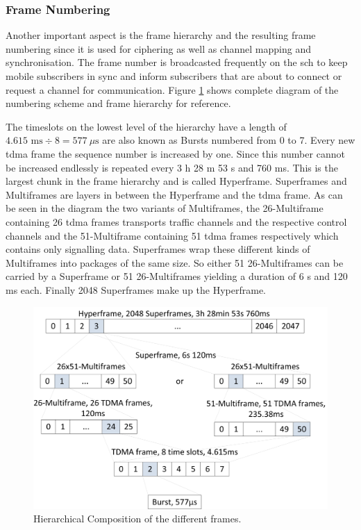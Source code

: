 \subsubsection{Frame Numbering}
Another important aspect is the frame hierarchy and the resulting frame numbering since it is used for ciphering as well as channel mapping and synchronisation.
The frame number is broadcasted frequently on the \gls{sch} to keep mobile subscribers in sync and inform subscribers that are about to connect or request a channel for communication.
Figure \ref{fig:frame_hierarchy} shows complete diagram of the numbering scheme and frame hierarchy for reference.

The timeslots on the lowest level of the hierarchy have a length of $4.615\text{ ms} \div 8 = 577~\mu\text{s}$ are also known as Bursts numbered from 0 to 7.
Every new \gls{tdma} frame the sequence number is increased by one.
Since this number cannot be increased endlessly is repeated every 3 h 28 m 53 s and 760 ms.
This is the largest chunk in the frame hierarchy and is called Hyperframe.
Superframes and Multiframes are layers in between the Hyperframe and the \gls{tdma} frame.
As can be seen in the diagram the two variants of Multiframes, the 26-Multiframe containing 26 \gls{tdma} frames transports traffic channels and the respective control channels and the 51-Multiframe containing 51 \gls{tdma} frames respectively which contains only signalling data.
Superframes wrap these different kinds of Multiframes into packages of the same size.
So either 51 26-Multiframes can be carried by a Superframe or 51 26-Multiframes yielding a duration of 6 s and 120 ms each.
Finally 2048 Superframes make up the Hyperframe.

\begin{figure}
	\centering
	\includegraphics{../Images/Frames}
	\caption{Hierarchical Composition of the different frames.}
	\label{fig:frame_hierarchy}
\end{figure}

